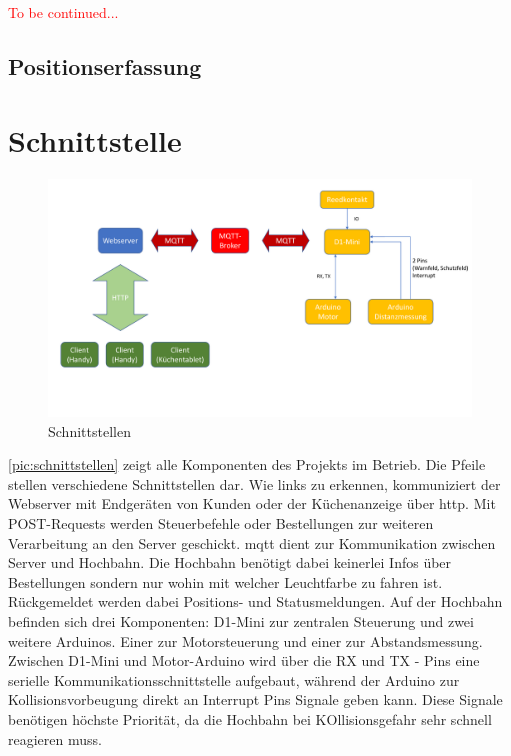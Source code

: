\textcolor{red}{To be continued...}



\subsection{Positionserfassung}
\newpage
\section{Schnittstelle}

\begin{figure}[h]
	\centering
	\includegraphics[width=17cm]{schnittstellen.pdf}
	\caption{Schnittstellen}
	\label{pic:schnittstellen}
\end{figure}

\autoref{pic:schnittstellen} zeigt alle Komponenten des Projekts im Betrieb. Die Pfeile stellen verschiedene Schnittstellen dar. Wie links zu erkennen, kommuniziert der Webserver 
mit Endgeräten von Kunden oder der Küchenanzeige über \acrshort{http}. Mit POST-Requests werden Steuerbefehle oder Bestellungen zur weiteren Verarbeitung an den Server geschickt.
\acrshort{mqtt} dient zur Kommunikation zwischen Server und Hochbahn. Die Hochbahn benötigt dabei keinerlei Infos über Bestellungen sondern nur wohin mit welcher Leuchtfarbe zu fahren ist.
Rückgemeldet werden dabei Positions- und Statusmeldungen. Auf der Hochbahn befinden sich drei Komponenten: D1-Mini zur zentralen Steuerung und zwei weitere Arduinos. Einer zur Motorsteuerung und einer 
zur Abstandsmessung. Zwischen D1-Mini und Motor-Arduino wird über die RX und TX - Pins eine serielle Kommunikationsschnittstelle aufgebaut, während der Arduino zur Kollisionsvorbeugung direkt an Interrupt Pins 
Signale geben kann. Diese Signale benötigen höchste Priorität, da die Hochbahn bei KOllisionsgefahr sehr schnell reagieren muss.


